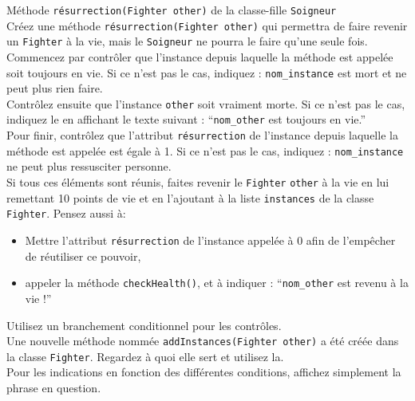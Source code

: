 \begin{Exercice}[15 minutes] Méthode \lstinline{résurrection(Fighter other)} de la classe-fille \lstinline{Soigneur} \\
Créez une méthode \lstinline{résurrection(Fighter other)} qui permettra de faire revenir un \lstinline{Fighter} à la vie, mais le \lstinline{Soigneur} ne pourra le faire qu'une seule fois. \\

Commencez par contrôler que l'instance depuis laquelle la méthode est appelée soit toujours en vie. Si ce n'est pas le cas, indiquez : \lstinline{nom_instance} est mort et ne peut plus rien faire.  \\ 

Contrôlez ensuite que l'instance \lstinline{other} soit vraiment morte. Si ce n'est pas le cas, indiquez le en affichant le texte suivant : ``\lstinline{nom_other} est toujours en vie.'' \\

Pour finir, contrôlez que l'attribut \lstinline{résurrection} de l'instance depuis laquelle la méthode est appelée est égale à 1. Si ce n'est pas le cas, indiquez : \lstinline{nom_instance} ne peut plus ressusciter personne.\\

Si tous ces éléments sont réunis, faites revenir le \lstinline{Fighter} \lstinline{other} à la vie en lui remettant 10 points de vie et en l'ajoutant à la liste \lstinline{instances} de la classe \lstinline{Fighter}. Pensez aussi à:

\begin{itemize}
	\item Mettre l'attribut \lstinline{résurrection} de l'instance appelée à 0 afin de l'empêcher de réutiliser ce pouvoir,
	\item appeler la méthode \lstinline{checkHealth()}, et à indiquer : ``\lstinline{nom_other} est revenu à la vie !''
\end{itemize}

\begin{conseil}
Utilisez un branchement conditionnel pour les contrôles. \\

Une nouvelle méthode nommée \lstinline{addInstances(Fighter other)} a été créée dans la classe \lstinline{Fighter}. Regardez à quoi elle sert et utilisez la. \\

Pour les indications en fonction des différentes conditions, affichez simplement la phrase en question. \\
\end{conseil}

\begin{solution}
	
\end{solution}

\end{Exercice}

